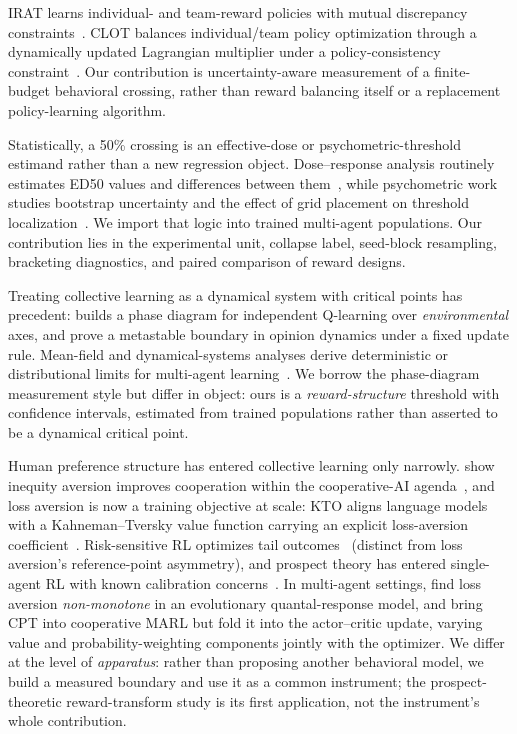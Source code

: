 IRAT learns individual- and team-reward policies with mutual discrepancy
constraints~\citep{wang2022irat}. CLOT balances individual/team policy optimization
through a dynamically updated Lagrangian multiplier under a policy-consistency
constraint~\citep{zhang2026clot}. Our contribution is uncertainty-aware measurement
of a finite-budget behavioral crossing, rather than reward balancing itself or
a replacement policy-learning algorithm.

Statistically, a 50\% crossing is an effective-dose or psychometric-threshold estimand rather than a
new regression object. Dose--response analysis routinely estimates ED50 values and differences
between them~\citep{ritz2015dose}, while psychometric work studies bootstrap uncertainty and the
effect of grid placement on threshold localization~\citep{wichmann2001psychometric}. We import that
logic into trained multi-agent populations. Our contribution lies in the experimental unit, collapse
label, seed-block resampling, bracketing diagnostics, and paired comparison of reward designs.

Treating collective learning as a dynamical system with critical points has
precedent: \citet{yamaguchi2025} builds a phase diagram for independent Q-learning over
\emph{environmental} axes, and \citet{capannoli2026phase} prove a metastable boundary in opinion
dynamics under a fixed update rule. Mean-field and dynamical-systems analyses derive deterministic or
distributional limits for multi-agent learning~\citep{hu2019meanfield,barfuss2019deterministic,hussain2025convergence}.
We borrow the phase-diagram measurement style but differ in object: ours is a \emph{reward-structure}
threshold with confidence intervals, estimated from trained populations rather than asserted to be a
dynamical critical point.

Human preference structure has entered collective learning only narrowly.
\citet{hughes2018inequity} show inequity aversion improves cooperation within the cooperative-AI
agenda~\citep{dafoe2020open,hammond2025multiagent,barfuss2020caring}, and loss aversion is now a
training objective at scale: KTO aligns language models with a Kahneman--Tversky value function
carrying an explicit loss-\allowbreak aversion coefficient~\citep{ethayarajh2024kto}. Risk-sensitive RL optimizes
tail outcomes~\citep{qiu2021rmix,xie2023riskq,prashanth2014cvar,tamar2015optimizing} (distinct from
loss aversion's reference-point asymmetry), and prospect theory has entered single-agent RL with known
calibration concerns~\citep{prashanth2016cumulative,rabin2000risk,tversky1992}. In multi-agent settings,
\citet{mengesha2025} find loss aversion \emph{non-monotone} in an evolutionary quantal-response model,
and \citet{lalmohammed2025} bring CPT into cooperative MARL but fold it into the actor--critic update,
varying value and probability-weighting components jointly with the optimizer. We differ at the level of \emph{apparatus}: rather than proposing
another behavioral model, we build a measured boundary and use it as a common instrument; the
prospect-theoretic reward-transform study is its first application, not the instrument's whole
contribution.

